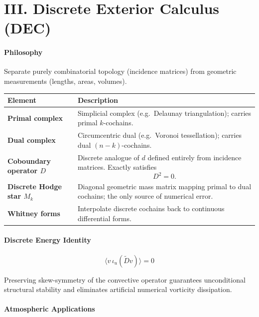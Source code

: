 \documentclass[11pt]{article}
\begin{document}
\section*{III. Discrete Exterior Calculus (DEC)}

\paragraph{Philosophy}

Separate purely combinatorial topology (incidence matrices) from
geometric measurements (lengths, areas, volumes).

\begin{longtable}{>{\bfseries}p{}p{}}
Element & Description\\
\midrule

Primal complex &
Simplicial complex (e.g.\ Delaunay triangulation); carries primal
$k$-cochains.\\

Dual complex &
Circumcentric dual (e.g.\ Voronoi tessellation); carries dual
$(n-k)$-cochains.\\

Coboundary operator $D$ &
Discrete analogue of $d$ defined entirely from incidence matrices.
Exactly satisfies
\[
D^2=0.
\]
\\

Discrete Hodge star $M_k$ &
Diagonal geometric mass matrix mapping primal to dual cochains;
the only source of numerical error.\\

Whitney forms &
Interpolate discrete cochains back to continuous differential forms.
\end{longtable}

\paragraph{Discrete Energy Identity}

\[
\boxed{
\langle v\,\iota_u(\widetilde Dv)\rangle=0
}
\]

Preserving skew-symmetry of the convective operator guarantees
unconditional structural stability and eliminates artificial numerical
vorticity dissipation.

\paragraph{Atmospheric Applications}
\end{document}
